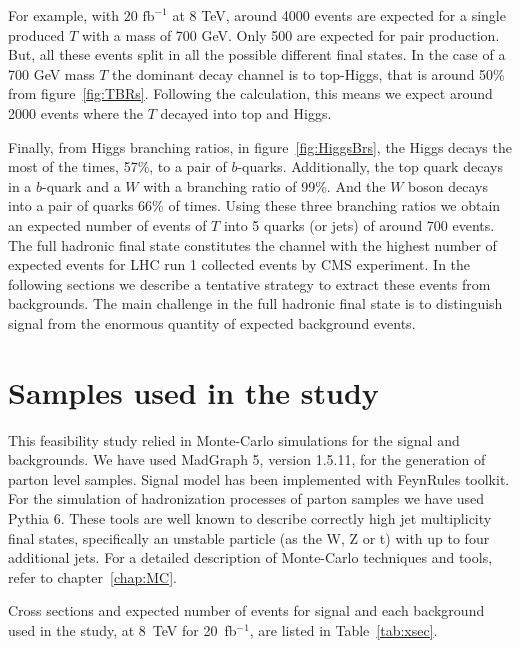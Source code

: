 For example, with 20 $\text{fb}^{-1}$ at 8 TeV, around 4000 events are expected for a single produced $T$ with a mass of 700 GeV. Only 500 are expected for pair production. But, all these events split in all the possible different final states. In the case of a 700 GeV mass $T$ the dominant decay channel is to top-Higgs, that is around 50\% from figure~\ref{fig:TBRs}. Following the calculation, this means we expect around 2000 events where the $T$ decayed into top and Higgs. 

Finally, from Higgs branching ratios, in figure~\ref{fig:HiggsBrs}, the Higgs decays the most of the times, 57\%, to a pair of $b$-quarks. Additionally, the top quark decays in a $b$-quark and a $W$ with a branching ratio of 99\%. And the $W$ boson decays into a pair of quarks 66\% of times. Using these three branching ratios we obtain an expected number of events of $T$ into 5 quarks (or jets) of around 700 events. The full hadronic final state constitutes the channel with the highest number of expected events for LHC run 1 collected events by CMS experiment. In the following sections we describe a tentative strategy to extract these events from backgrounds. The main challenge in the full hadronic final state is to distinguish signal from the enormous quantity of expected background events.


\section{Samples used in the study}
\label{sec:PhenoSam}

This feasibility study relied in Monte-Carlo simulations for the signal and backgrounds. We have used MadGraph 5, version 1.5.11, for the generation of parton level samples. Signal model has been implemented with FeynRules toolkit. For the simulation of hadronization processes of parton samples we have used Pythia 6. These tools are well known to describe correctly high jet multiplicity final states, specifically an unstable particle (as the W, Z or t) with up to four additional jets. For a detailed description of Monte-Carlo techniques and tools, refer to chapter~\ref{chap:MC}. 

Cross sections and expected number of events for signal and each background used in the study, at 8~TeV for 20~fb$^{-1}$, are listed in Table~\ref{tab:xsec}.

